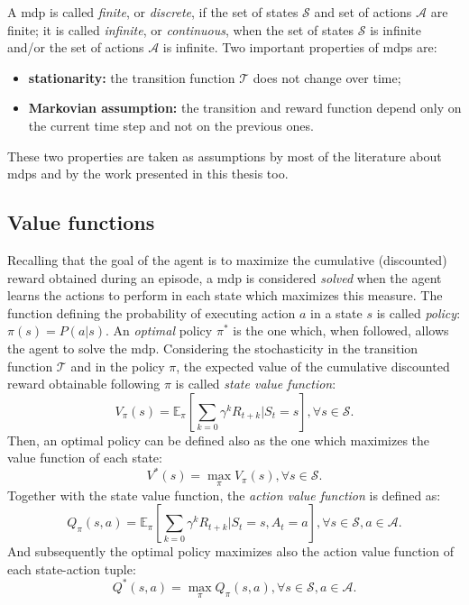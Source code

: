 A \gls{mdp} is called \textit{finite}, or \textit{discrete}, if the set of states $\mathcal{S}$ and set of actions $\mathcal{A}$ are finite; it is called \textit{infinite}, or \textit{continuous}, when the set of states $\mathcal{S}$ is infinite and/or the set of actions $\mathcal{A}$ is infinite.
Two important properties of \glspl{mdp} are:
\begin{itemize}
 \item \textbf{stationarity:} the transition function $\mathcal{T}$ does not change over time;
 \item \textbf{Markovian assumption:} the transition and reward function depend only on the current time step and not on the previous ones.
\end{itemize}
These two properties are taken as assumptions by most of the literature about \glspl{mdp} and by the work presented in this thesis too.

\subsection{Value functions}
Recalling that the goal of the agent is to maximize the cumulative (discounted) reward obtained during an episode, a \gls{mdp} is considered \textit{solved} when the agent learns the actions to perform in each state which maximizes this measure. The function defining the probability of executing action $a$ in a state $s$ is called \textit{policy}: $\pi(s) = P(a|s)$. An \textit{optimal} policy $\pi^*$ is the one which, when followed, allows the agent to solve the \gls{mdp}. Considering the stochasticity in the transition function $\mathcal{T}$ and in the policy $\pi$, the expected value of the cumulative discounted reward obtainable following $\pi$ is called \textit{state value function}:
\begin{equation}
 V_\pi(s) = \mathbb{E}_\pi[\sum_{k=0} \gamma^k R_{t+k} | S_t = s], \forall s \in \mathcal{S}.
\end{equation}
Then, an optimal policy can be defined also as the one which maximizes the value function of each state:
\begin{equation}
 V^*(s) = \max_\pi V_\pi(s), \forall s \in \mathcal{S}.
\end{equation}
Together with the state value function, the \textit{action value function} is defined as:
\begin{equation}
 Q_\pi(s, a) = \mathbb{E}_\pi[\sum_{k=0} \gamma^k R_{t+k} | S_t = s, A_t = a], \forall s \in \mathcal{S}, a \in \mathcal{A}.
\end{equation}
And subsequently the optimal policy maximizes also the action value function of each state-action tuple:
\begin{equation}
 Q^*(s,a) = \max_\pi Q_\pi(s,a), \forall s \in \mathcal{S}, a \in \mathcal{A}.
\end{equation}

